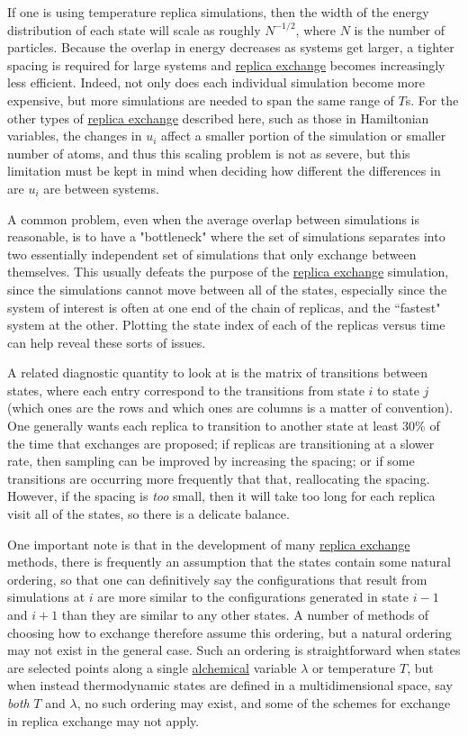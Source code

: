 \documentclass[9pt,review]{livecoms}
\begin{document}
If one is using temperature replica simulations, then the width of the energy distribution of each state will scale as roughly $N^{-1/2}$, where $N$ is the number of particles. Because the overlap in energy decreases as systems get larger, a tighter spacing is required for large systems and \hyperlink{ref:ReplEx} {replica exchange} becomes increasingly less efficient. Indeed, not only does each individual simulation become more expensive, but more simulations are needed to span the same range of $T$s. For the other types of \hyperlink{ref:ReplEx} {replica exchange} described here, such as those in Hamiltonian variables, the changes in $u_i$ affect a smaller portion of the simulation or smaller number of atoms, and thus this scaling problem is not as severe, but this limitation must be kept in mind when deciding how different the differences in are $u_i$ are between systems.

A common problem, even when the average overlap between simulations is reasonable, is to have a "bottleneck" where the set of simulations separates into two essentially independent set of simulations that only exchange between themselves. This usually defeats the purpose of the \hyperlink{ref:ReplEx} {replica exchange} simulation, since the simulations cannot move between all of the states, especially since the system of interest is often at one end of the chain of replicas, and the ``fastest" system at the other. Plotting the state index of each of the replicas versus time can help reveal these sorts of issues.


A related diagnostic quantity to look at is the matrix of transitions between states, where each entry correspond to the transitions from state $i$ to state $j$ (which ones are the rows and which ones are columns is a matter of convention).  One generally wants each replica to transition to another state at least 30\% of the time that exchanges are proposed; if replicas are transitioning at a slower rate, then sampling can be improved by increasing the spacing; or if some transitions are occurring more frequently that that, reallocating the spacing. However, if the spacing is \textit{too} small, then it will take too long for each replica visit all of the states, so there is a delicate balance. 


One important note is that in the development of many \hyperlink{ref:ReplEx} {replica exchange} methods, there is frequently an assumption that the states contain some natural ordering, so that one can definitively say the configurations that result from simulations at $i$ are more similar to the configurations generated in state $i-1$ and $i+1$ than they are similar to any other states.  A number of methods of choosing how to exchange therefore assume this ordering, but a natural ordering may not exist in the general case.  Such an ordering is straightforward when states are selected points along a single \hyperlink{ref:Alchemical} {alchemical} variable $\lambda$ or temperature $T$, but when instead thermodynamic states are defined in a multidimensional space, say \emph{both} $T$ and $\lambda$, no such ordering may exist, and some of the schemes for exchange in replica exchange may not apply.
\end{document}
